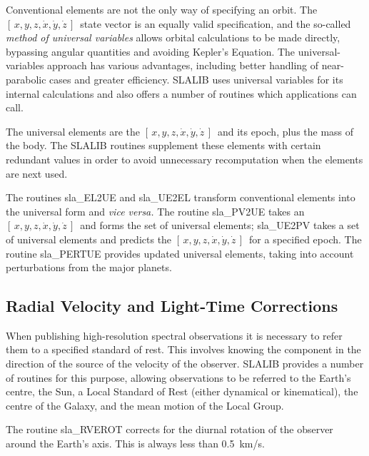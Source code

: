 \documentclass[11pt,twoside]{article}
\newcommand{\xyzxyzd}   {$[\,x,y,z,\dot{x},\dot{y},\dot{z}\,]$}
\begin{document}
Conventional elements are not the only way of specifying an orbit.
The \xyzxyzd\ state vector is an equally valid specification,
and the so-called {\it method of universal variables}\/ allows
orbital calculations to be made directly, bypassing angular
quantities and avoiding Kepler's Equation.  The universal-variables
approach has various advantages, including better handling of
near-parabolic cases and greater efficiency.
SLALIB uses universal variables for its internal
calculations and also offers a number of routines which
applications can call.

The universal elements are the \xyzxyzd\ and its epoch, plus the mass
of the body.  The SLALIB routines supplement these elements with
certain redundant values in order to
avoid unnecessary recomputation when the elements are next used.

The routines
sla\_EL2UE and
sla\_UE2EL transform conventional elements into the
universal form and {\it vice versa.}
The routine
sla\_PV2UE takes an \xyzxyzd\ and forms the set of universal
elements;
sla\_UE2PV takes a set of universal elements and predicts the \xyzxyzd\
for a specified epoch.
The routine
sla\_PERTUE provides updated universal elements,
taking into account perturbations from the major planets.

\subsection{Radial Velocity and Light-Time Corrections}
When publishing high-resolution spectral observations
it is necessary to refer them to a specified standard of rest.
This involves knowing the component in the direction of the
source of the velocity of the observer.  SLALIB provides a number
of routines for this purpose, allowing observations to be
referred to the Earth's centre, the Sun, a Local Standard of Rest
(either dynamical or kinematical), the centre of the Galaxy, and
the mean motion of the Local Group.

The routine
sla\_RVEROT
corrects for the diurnal rotation of
the observer around the Earth's axis.  This is always less than 0.5~km/s.
\end{document}
